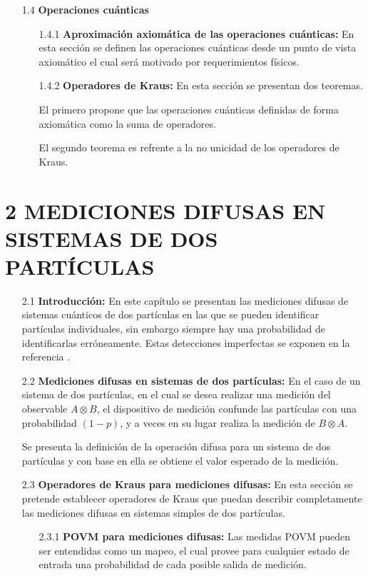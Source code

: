 \documentclass[12pt,oneside]{book}\raggedbottom{} %
\begin{document}
\begin{sloppypar}
{{\begin{itemize}
\begin{itemize}
  En estos casos es importante estudiar las medidas POVM\@. Se define las medidas POVM y se mencionan varias razones por las que  estos operadores son de utilidad.
\end{itemize}
\item[1.4]\textbf{Operaciones cuánticas}
\begin{itemize}
  \item[1.4.1] \textbf{Aproximación axiomática de las operaciones cuánticas:} En esta sección se definen las operaciones cuánticas desde un punto de vista
 axiomático el cual será motivado por requerimientos físicos. 
  \item[1.4.2] \textbf{Operadores de Kraus: }En esta sección se presentan dos teoremas.
  
  El primero propone que las operaciones cuánticas definidas de forma axiomática como la suma de operadores.
  
  El segundo teorema es refrente a la no unicidad de los operadores de Kraus.
\end{itemize}
\end{itemize}

\section*{2 MEDICIONES DIFUSAS EN SISTEMAS DE DOS PARTÍCULAS}
\begin{itemize}
\item[2.1] \textbf{Introducción:} En este capítulo se presentan las mediciones difusas de sistemas cuánticos de dos partículas en las que se pueden identificar partículas individuales, sin embargo siempre hay una probabilidad de identificarlas erróneamente. Estas detecciones imperfectas se exponen en la referencia {\cite{Pineda_2021}}. 
\item[2.2] \textbf{Mediciones difusas en sistemas de dos partículas:}
En el caso de un sistema de dos partículas, en el cual se desea realizar una medición del observable $A\otimes B$, el dispositivo de medición confunde las partículas con una probabilidad $(1-p)$, y a veces en su lugar realiza la medición de $B\otimes A$. 

Se presenta la definición de la operación difusa para un sistema de dos partículas y con base en ella se obtiene el valor esperado de la medición. 
\item[2.3] \textbf{Operadores de Kraus para mediciones difusas:} En esta sección se pretende establecer operadores de Kraus que puedan describir completamente las mediciones difusas en sistemas simples de dos partículas.
\begin{itemize}
  \item[2.3.1] \textbf{POVM para mediciones difusas:} 
  Las medidas POVM pueden ser entendidas como un mapeo, el cual provee para cualquier estado de entrada una probabilidad de cada posible salida de medición. 
  

\end{itemize}
\end{itemize}}}
\end{sloppypar}
\end{document}
